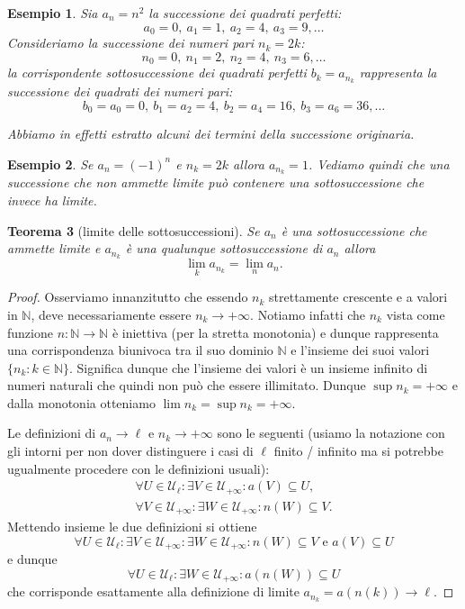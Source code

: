 \documentclass[italian,a4paper,oneside,headinclude]{scrbook}
\renewcommand{\subset}{\subseteq}
\newcommand{\U}{\mathcal U}
\newcommand{\NN}{\mathbb N}
\newtheorem{theorem}{Teorema}
\newtheorem{example}[theorem]{Esempio}
\begin{document}
\begin{example}
Sia $a_n = n^2$ la successione dei quadrati perfetti:
\[
  a_0 = 0,\
  a_1 = 1,\
  a_2 = 4,\
  a_3 =9, \dots
\]
Consideriamo la successione dei numeri pari $n_k = 2k$:
\[
 n_0 = 0,\
 n_1 = 2,\
 n_2=4,\
 n_3=6, \dots
\]
la corrispondente sottosuccessione dei quadrati perfetti $b_k = a_{n_k}$
rappresenta la successione dei quadrati dei numeri pari:
\[
b_0 = a_0 = 0,\
b_1 = a_2 = 4,\
b_2 = a_4 = 16,\
b_3 = a_6 = 36, \dots
\]

Abbiamo in effetti \emph{estratto} alcuni dei termini della successione
originaria.
\end{example}

\begin{example}
Se $a_n = (-1)^n$ e $n_k=2k$ allora $a_{n_k} = 1$.
Vediamo quindi che una successione che non ammette limite
può contenere una sottosuccessione che invece ha limite.
\end{example}

\begin{theorem}[limite delle sottosuccessioni]
Se $a_n$ è una sottosuccessione che ammette limite
e $a_{n_k}$ è una qualunque sottosuccessione di $a_n$
allora
\[
\lim_k a_{n_k} = \lim_n a_n.
\]
\end{theorem}
%
\begin{proof}
Osserviamo innanzitutto che essendo $n_k$ strettamente crescente
e a valori in $\NN$, deve necessariamente essere $n_k\to +\infty$.
Notiamo infatti che $n_k$ vista come funzione $n\colon \NN\to \NN$
è iniettiva (per la stretta monotonia) e dunque rappresenta una
corrispondenza biunivoca tra il suo dominio $\NN$ e l'insieme dei
suoi valori $\{n_k \colon k \in \NN\}$. Significa dunque che l'insieme
dei valori è un insieme infinito di numeri naturali che quindi non può che
essere illimitato. Dunque $\sup n_k = +\infty$ e dalla monotonia
otteniamo $\lim n_k = \sup n_k = +\infty$.

Le definizioni di $a_n \to \ell$ e $n_k \to +\infty$ sono le seguenti
(usiamo la notazione con gli intorni per non dover distinguere
i casi di $\ell$ finito / infinito ma si potrebbe ugualmente
procedere con le definizioni usuali):
\begin{gather*}
 \forall U \in \U_\ell \colon \exists V \in \U_{+\infty} \colon
  a(V) \subset U,\\
 \forall V \in \U_{+\infty} \colon \exists W \in \U_{+\infty} \colon
  n(W) \subset V.
\end{gather*}
Mettendo insieme le due definizioni si ottiene
\[
  \forall U \in \U_\ell \colon
  \exists V \in \U_{+\infty} \colon
  \exists W \in \U_{+\infty} \colon
  n(W) \subset V \text{ e }
  a(V) \subset U
\]
e dunque
\[
  \forall U \in \U_\ell \colon \exists W \in \U_{+\infty} \colon
  a(n(W)) \subset U
\]
che corrisponde esattamente alla definizione di limite $a_{n_k} = a(n(k)) \to \ell$.
\end{proof}
\end{document}
